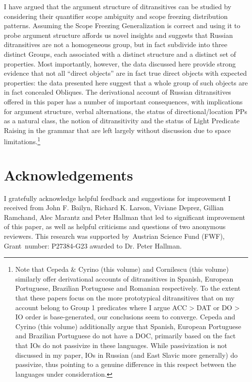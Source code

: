 \documentclass[output=paper,colorlinks,citecolor=brown,nonflat]{./langscibook}
\begin{document}
I have argued that the argument structure of ditransitives can be studied by considering their quantifier scope ambiguity and scope freezing distribution patterns. Assuming the Scope Freezing Generalization is correct and using it to probe argument structure affords us novel insights and suggests that Russian ditransitives are not a homogeneous group, but in fact subdivide into three distinct Groups, each associated with a distinct structure and a distinct set of properties. Most importantly, however, the data discussed here provide strong evidence that not all “direct objects” are in fact true direct objects with expected properties: the data presented here suggest that a whole group of such objects are in fact concealed Obliques. The derivational account of Russian ditransitives offered in this paper has a number of important consequences, with implications for argument structure, verbal alternations, the status of directional/location PPs as a natural class, the notion of ditransitivity and the status of Light Predicate Raising in the grammar that are left largely without discussion due to space limitations.\footnote{Note that Cepeda \& Cyrino (this volume) and Cornilescu (this volume) similarly offer derivational accounts of ditransitives in Spanish, European Portuguese, Brazilian Portuguese and Romanian respectively. To the extent that these papers focus on the more prototypical ditransitives that on my account belong to Group 1 predicates where I argue ACC > DAT or DO > IO order is base-generated, our conclusions seem to converge. Cepeda and Cyrino (this volume) additionally argue that Spanish, European Portuguese and Brazilian Portuguese do not have a DOC, primarily based on the fact that IOs do not passivize in these languages. While passivization is not discussed in my paper, IOs in Russian (and East Slavic more generally) do passivize, thus pointing to a genuine difference in this respect between the languages under consideration.} 

\section*{Acknowledgements}
I gratefully acknowledge helpful feedback and suggestions for improvement I received from John F. Bailyn, Richard K. Larson, Viviane Deprez, Gillian Ramchand, Alec Marantz and Peter Hallman that led to significant improvement of this paper, as well as helpful criticisms and questions of two anonymous reviewers. This research was supported by~Austrian Science Fund (FWF), Grant~number: P27384-G23 awarded to Dr. Peter Hallman.

\sloppy\printbibliography[heading=subbibliography,notkeyword=this]
\end{document}
